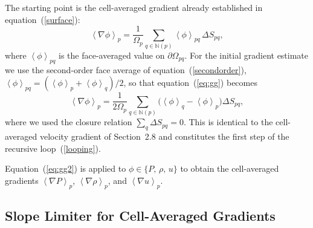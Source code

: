 \documentclass[twocolumn]{aastex63}
\newcommand{\vel}{{u}}
\newcommand{\surf}[0]{S}
\begin{document}
The starting point is the cell-averaged gradient already
established in equation~(\ref{surface}):
\begin{equation}\label{eq:gg}
  \left<\nabla\phi\right>_p
  = \frac{1}{\Omega_p}
    \sum_{q\in\mathbb{N}(p)}
      \left<\phi\right>_{pq}\,\Delta\surf_{pq},
\end{equation}
where $\left<\phi\right>_{pq}$ is the face-averaged value on
$\partial\Omega_{pq}$.
For the initial gradient estimate we use the second-order
face average of equation~(\ref{secondorder}),
$\left<\phi\right>_{pq} = (\left<\phi\right>_p + \left<\phi\right>_q)/2$,
so that equation~(\ref{eq:gg}) becomes
\begin{equation}\label{eq:gg2}
  \left<\nabla\phi\right>_p
  = \frac{1}{2\Omega_p}
    \sum_{q\in\mathbb{N}(p)}
      \bigl(\left<\phi\right>_q - \left<\phi\right>_p\bigr)
      \Delta\surf_{pq},
\end{equation}
where we used the closure relation
$\sum_q \Delta\surf_{pq} = 0$.
This is identical to the cell-averaged velocity gradient
of Section~2.8 and constitutes the first step of the
recursive loop~(\ref{looping}).

Equation~(\ref{eq:gg2}) is applied to $\phi \in \{P,\,\rho,\,\vel\}$
to obtain the cell-averaged gradients
$\left<\nabla P\right>_p$,
$\left<\nabla\rho\right>_p$, and
$\left<\nabla\vel\right>_p$.


\subsection{Slope Limiter for Cell-Averaged Gradients}
\end{document}
